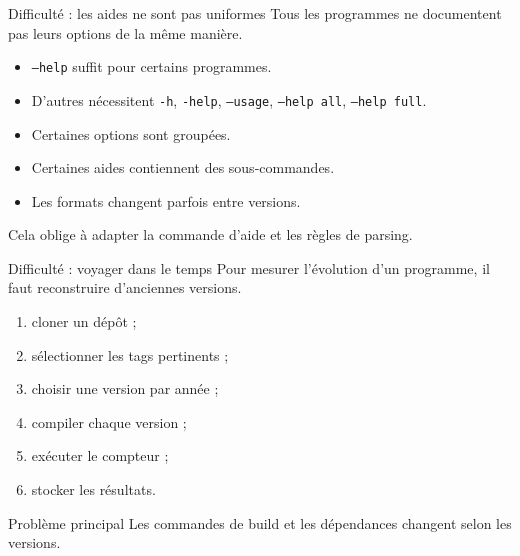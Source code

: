 \documentclass[10pt,aspectratio=169]{beamer}
\begin{document}
\begin{frame}{Difficulté : les aides ne sont pas uniformes}
  Tous les programmes ne documentent pas leurs options de la même manière.

  \begin{itemize}
    \item \texttt{--help} suffit pour certains programmes.
    \item D'autres nécessitent \texttt{-h}, \texttt{-help}, \texttt{--usage}, \texttt{--help all}, \texttt{--help full}.
    \item Certaines options sont groupées.
    \item Certaines aides contiennent des sous-commandes.
    \item Les formats changent parfois entre versions.
  \end{itemize}

  \vspace{0.3cm}
  Cela oblige à adapter la commande d'aide et les règles de parsing.
\end{frame}

\begin{frame}{Difficulté : voyager dans le temps}
  Pour mesurer l'évolution d'un programme, il faut reconstruire d'anciennes versions.

  \begin{enumerate}
    \item cloner un dépôt ;
    \item sélectionner les tags pertinents ;
    \item choisir une version par année ;
    \item compiler chaque version ;
    \item exécuter le compteur ;
    \item stocker les résultats.
  \end{enumerate}

  \vspace{0.3cm}
  \begin{alertblock}{Problème principal}
    Les commandes de build et les dépendances changent selon les versions.
  \end{alertblock}
\end{frame}
\end{document}

